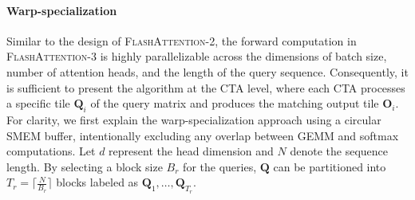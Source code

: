 \paragraph{Warp-specialization}
Similar to the design of \textsc{FlashAttention-2}, the forward computation in \textsc{FlashAttention-3} is highly parallelizable across the dimensions of batch size, number of attention heads, and the length of the query sequence. Consequently, it is sufficient to present the algorithm at the CTA level, where each CTA processes a specific tile $\mathbf{Q}_i$ of the query matrix and produces the matching output tile $\mathbf{O}_i$. For clarity, we first explain the warp-specialization approach using a circular SMEM buffer, intentionally excluding any overlap between GEMM and softmax computations. Let $d$ represent the head dimension and $N$ denote the sequence length. By selecting a block size $B_r$ for the queries, $\mathbf{Q}$ can be partitioned into $T_r = \lceil \frac{N}{B_r} \rceil$ blocks labeled as $\mathbf{Q}_1, \ldots, \mathbf{Q}_{T_r}$.

